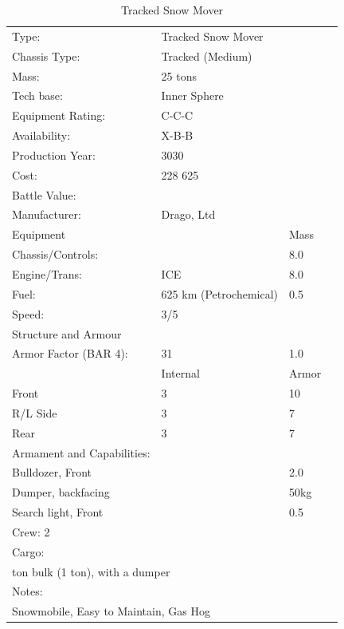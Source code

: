 \documentclass{tufte-book}
\begin{document}
\bigskip
\begin{table}
\begin{minipage}{\textwidth}
\begin{center}
\begin{tabular}{llll}
\toprule
Type: & Tracked Snow Mover & \\
Chassis Type: & Tracked (Medium) & \\
Mass: & 25 tons & \\
Tech base: & Inner Sphere & \\
Equipment Rating: & C-C-C & \\
Availability: & X-B-B & \\
Production Year: & 3030 & \\
Cost: & 228 625 & \\
Battle Value: & & \\
Manufacturer: & Drago, Ltd & \\
Equipment & & Mass \\
\quad Chassis/Controls: & & 8.0 \\
\quad Engine/Trans: & ICE & 8.0 \\
\quad Fuel: & 625 km (Petrochemical) & 0.5 \\
\quad Speed: & \multicolumn{2}{l}{3/5} \\
Structure and Armour & & \\
\quad Armor Factor (BAR 4): & 31 & 1.0 \\
\quad & Internal & Armor \\
\quad Front & 3 & 10 \\
\quad R/L Side & 3 & 7 \\
\quad Rear & 3 & 7 \\

Armament and Capabilities: & & \\
\multicolumn{2}{l}{\quad Bulldozer, Front} & 2.0 \\
\multicolumn{2}{l}{\quad Dumper, backfacing} & 50kg \\
\multicolumn{2}{l}{\quad Search light, Front} & 0.5 \\

\multicolumn{3}{l}{Crew: 2} \\
Cargo: & & \\
\multicolumn{3}{l}{\quad 1 ton bulk (1 ton), with a dumper} \\

Notes: & & \\
\multicolumn{3}{l}{\quad Snowmobile, Easy to Maintain, Gas Hog} \\

\bottomrule
\end{tabular}
\end{center}
\end{minipage}
\caption{Tracked Snow Mover}
\end{table}
\end{document}
